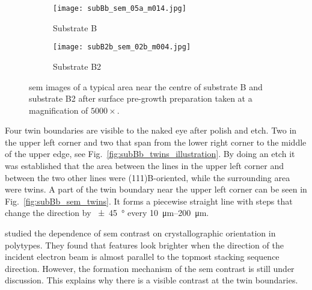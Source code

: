 
\begin{figure}[htbp]
    \begin{subfigure}[t]{0.49\textwidth}
        \texttt{[image: subBb\_sem\_05a\_m014.jpg]}
        \caption{Substrate B}\label{fig:subBb_sem_typical_centre}
    \end{subfigure}%
    \hfill
    \begin{subfigure}[t]{0.49\textwidth}
        \texttt{[image: subB2b\_sem\_02b\_m004.jpg]}
        \caption{Substrate B2}\label{fig:subB2b_sem_typical_centre}
    \end{subfigure}%
    \caption[\Ac{sem} images of typical areas on substrate B and B2 with surface pre-growth preparation.]{\Acf{sem} images of a typical area near the centre of substrate B and substrate B2 after surface pre-growth preparation taken at a magnification of $5000\times$.}\label{fig:subBb_and_subB2b_sem_typical}
\end{figure}

Four twin boundaries are visible to the naked eye after polish and etch. Two in the upper left corner and two that span from the lower right corner to the middle of the upper edge, see Fig.~\ref{fig:subBb_twins_illustration}. By doing an  etch it was established that the area between the lines in the upper left corner and between the two other lines were (111)B-oriented, while the surrounding area were twins. A part of the twin boundary near the upper left corner can be seen in Fig.~\ref{fig:subBb_sem_twins}. It forms a piecewise straight line with steps that change the direction by \SI{\pm 45}{\degree} every \SIrange{10}{200}{\micro\metre}.

\citet{ashida2015crystallographic} studied the dependence of \ac{sem} contrast on crystallographic orientation in  polytypes. They found that features look brighter when the direction of the incident electron beam is almost parallel to the topmost stacking sequence direction. However, the formation mechanism of the \ac{sem} contrast is still under discussion. This explains why there is a visible contrast at the twin boundaries.

